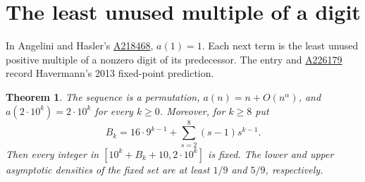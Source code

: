 \documentclass[11pt]{article}
\newtheorem{theorem}{Theorem}\newtheorem{lemma}[theorem]{Lemma}
\newcommand{\seqref}[1]{\href{https://oeis.org/#1}{#1}}
\begin{document}
\section{The least unused multiple of a digit}
In Angelini and Hasler's \seqref{A218468}, $a(1)=1$. Each next term is the least unused positive multiple of a nonzero digit of its predecessor. The entry and \seqref{A226179} record Havermann's 2013 fixed-point prediction.
\begin{theorem}\label{fixed}
The sequence is a permutation, $a(n)=n+O(n^\alpha)$, and $a(2\cdot10^k)=2\cdot10^k$ for every $k\ge0$. Moreover, for $k\ge8$ put
\[
 B_k=16\cdot9^{k-1}+\sum_{s=2}^8(s-1)s^{k-1}.
\]
Then every integer in $[10^k+B_k+10,2\cdot10^k]$ is fixed. The lower and upper asymptotic densities of the fixed set are at least $1/9$ and $5/9$, respectively.
\end{theorem}
\end{document}
